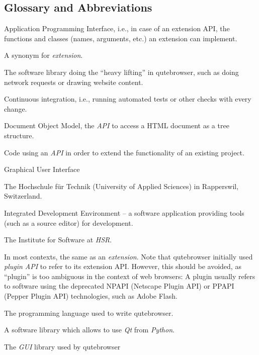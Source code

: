 \documentclass[a4paper,parskip=full]{scrreprt}
\begin{document}
\begin{appendices}
\chapter{Glossary and Abbreviations}
\begin{multicols}{2}
\label{ch:glossary}
\begin{description}[leftmargin=0pt]
  \item[API]{Application Programming Interface, i.e., in
      case of an extension API, the functions and classes (names, arguments,
      etc.) an extension can implement.}
  \item[add-on]{A synonym for \emph{extension}.}
  \item[backend]{The software library doing the ``heavy lifting'' in
      qutebrowser, such as doing network requests or drawing website content.}
  \item[CI]{Continuous integration, i.e., running automated tests or other
      checks with every change.}
  \item[DOM]{Document Object Model, the \emph{API} to access a HTML document as
      a tree structure.}
  \item[extension]{Code using an \emph{API} in order to extend the functionality
      of an existing project.}
  \item[GUI]{Graphical User Interface}
  \item[HSR]{The Hochschule für Technik (University of Applied Sciences) in
      Rapperswil, Switzerland.}
  \item[IDE]{Integrated Development Environment -- a software application
      providing tools (such as a source editor) for development.}
  \item[IFS]{The Institute for Software at \emph{HSR}.}
  \item[plugin]{In most contexts, the same as an \emph{extension}. Note that
      qutebrowser initially used \emph{plugin API} to refer to its extension
      API. However, this should be avoided, as ``plugin'' is too ambiguous in
      the context of web browsers: A plugin usually refers to software using the
      deprecated NPAPI (Netscape Plugin API) or PPAPI (Pepper Plugin API)
      technologies, such as Adobe Flash.}
  \item[Python]{The programming language used to write qutebrowser.}
  \item[PyQt]{A software library which allows to use \emph{Qt} from \emph{Python}.}
  \item[Qt]{The \emph{GUI} library used by qutebrowser}

\end{description}
\end{multicols}
\end{appendices}
\end{document}
